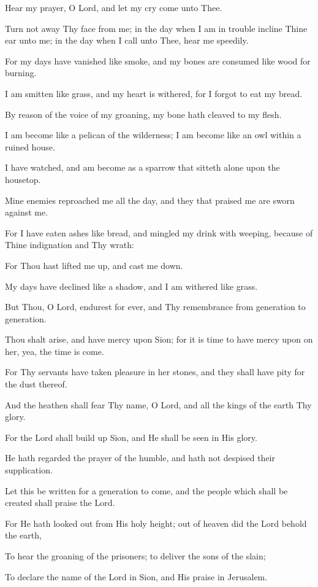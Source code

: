Hear my prayer, O Lord, and let my cry come unto Thee.

Turn not away Thy face from me; in the day when I am in trouble incline Thine ear unto me; in the day when I call unto Thee, hear me speedily.

For my days have vanished like smoke, and my bones are consumed like wood for burning.

I am smitten like grass, and my heart is withered, for I forgot to eat my bread.

By reason of the voice of my groaning, my bone hath cleaved to my flesh.

I am become like a pelican of the wilderness; I am become like an owl within a ruined house.

I have watched, and am become as a sparrow that sitteth alone upon the housetop.

Mine enemies reproached me all the day, and they that praised me are sworn against me.

For I have eaten ashes like bread, and mingled my drink with weeping, because of Thine indignation and Thy wrath:

For Thou hast lifted me up, and cast me down.

My days have declined like a shadow, and I am withered like grass.

But Thou, O Lord, endurest for ever, and Thy remembrance from generation to generation.

Thou shalt arise, and have mercy upon Sion; for it is time to have mercy upon on her, yea, the time is come.

For Thy servants have taken pleasure in her stones, and they shall have pity for the dust thereof.

And the heathen shall fear Thy name, O Lord, and all the kings of the earth Thy glory.

For the Lord shall build up Sion, and He shall be seen in His glory.

He hath regarded the prayer of the humble, and hath not despised their supplication.

Let this be written for a generation to come, and the people which shall be created shall praise the Lord.

For He hath looked out from His holy height; out of heaven did the Lord behold the earth,

To hear the groaning of the prisoners; to deliver the sons of the slain;

To declare the name of the Lord in Sion, and His praise in Jerusalem.

